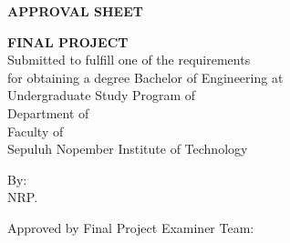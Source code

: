 \begin{center}
  \large
  \textbf{APPROVAL SHEET}
\end{center}

\thispagestyle{empty}

\begin{center}
  \textbf{\engtatitle{}}
\end{center}

\begingroup
\small

\begin{center}
  \textbf{FINAL PROJECT}
  \\Submitted to fulfill one of the requirements \\
  for obtaining a degree Bachelor of Engineering at \\
  Undergraduate Study Program of \engstudyprogram{} \\
  Department of \engdepartment{} \\
  Faculty of \engfaculty{} \\
  Sepuluh Nopember Institute of Technology
\end{center}

\begin{center}
  By: \textbf{\name{}}
  \\NRP. \nrp{}
\end{center}
 
 \begin{center}
   Approved by Final Project Examiner Team:
 \end{center}
 
 \begingroup
 \setlength{\tabcolsep}{0pt}
 
